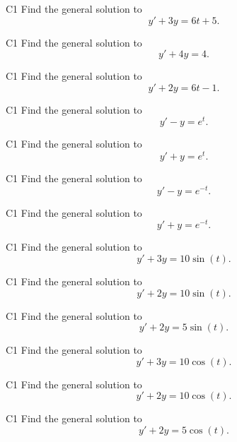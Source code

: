 \begin{problem}{C1}
Find the general solution to
\[
y'+3y=6t+5.
\]
\end{problem}

\begin{problem}{C1}
Find the general solution to
\[
y'+4y=4.
\]
\end{problem}

\begin{problem}{C1}
Find the general solution to
\[
y'+2y=6t-1.
\]
\end{problem}

\begin{problem}{C1}
Find the general solution to
\[
y'-y=e^t.
\]
\end{problem}

\begin{problem}{C1}
Find the general solution to
\[
y'+y=e^t.
\]
\end{problem}

\begin{problem}{C1}
Find the general solution to
\[
y'-y=e^{-t}.
\]
\end{problem}

\begin{problem}{C1}
Find the general solution to
\[
y'+y=e^{-t}.
\]
\end{problem}

\begin{problem}{C1}
Find the general solution to
\[
y'+3y=10\sin(t).
\]
\end{problem}

\begin{problem}{C1}
Find the general solution to
\[
y'+2y=10\sin(t).
\]
\end{problem}

\begin{problem}{C1}
Find the general solution to
\[
y'+2y=5\sin(t).
\]
\end{problem}

\begin{problem}{C1}
Find the general solution to
\[
y'+3y=10\cos(t).
\]
\end{problem}

\begin{problem}{C1}
Find the general solution to
\[
y'+2y=10\cos(t).
\]
\end{problem}

\begin{problem}{C1}
Find the general solution to
\[
y'+2y=5\cos(t).
\]
\end{problem}
